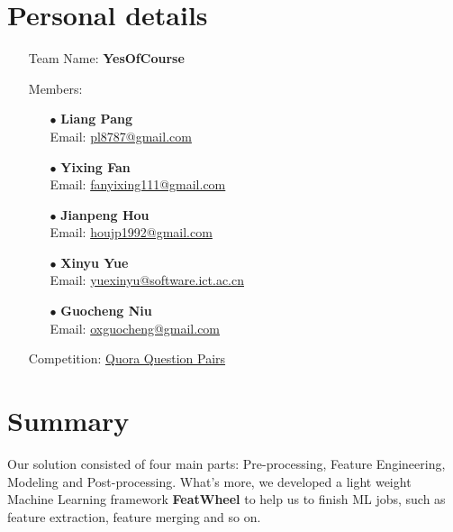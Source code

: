 \documentclass[12pt]{article}
\begin{document}
\section*{Personal details}
\begin{itemize}
\item[] Team Name: \textbf{YesOfCourse}
\item[] Members:
\begin{itemize}
\item[$\bullet$] \textbf{Liang Pang} \\
	Email: \url{pl8787@gmail.com}
\item[$\bullet$] \textbf{Yixing Fan} \\
	Email: \url{fanyixing111@gmail.com }
\item[$\bullet$] \textbf{Jianpeng Hou} \\
	Email: \url{houjp1992@gmail.com}
\item[$\bullet$] \textbf{Xinyu Yue} \\
	Email: \url{yuexinyu@software.ict.ac.cn}
\item[$\bullet$] \textbf{Guocheng Niu} \\
	Email: \url{oxguocheng@gmail.com}
\end{itemize}
\item[] Competition: \href{https://www.kaggle.com/c/quora-question-pairs/}{Quora Question Pairs}
\end{itemize}

\newpage
\tableofcontents

\newpage


\section{Summary}

Our solution consisted of four main parts: Pre-processing, Feature Engineering, Modeling and Post-processing. What's more, we developed a light weight Machine Learning framework \textbf{FeatWheel} to help us to finish ML jobs, such as feature extraction, feature merging and so on.
\end{document}
